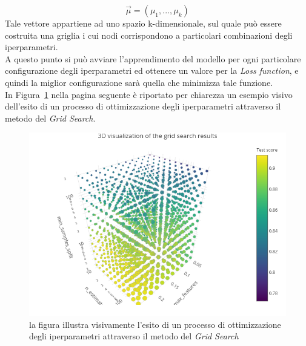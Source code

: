 \begin{equation}
\vec{\mu} = (\mu_1,...,\mu_k)
\end{equation}
Tale vettore appartiene ad uno spazio k-dimensionale, sul quale può essere costruita una griglia i cui nodi corrispondono a particolari combinazioni degli iperparametri. \\
A questo punto si può avviare l'apprendimento del modello per ogni particolare configurazione degli iperparametri ed ottenere un valore per la \textit{Loss function}, e quindi la miglior configurazione sarà quella che minimizza tale funzione. \\
In Figura~\ref{fig:Grid Search} nella pagina seguente è riportato per chiarezza un esempio visivo dell'esito di un processo di ottimizzazione degli iperparametri attraverso il metodo del \textit{Grid Search}.

\begin{figure}[h!]
	\includegraphics[width=\linewidth]{figs/Grid_immagine.png}
	\caption{la figura illustra visivamente l'esito di un processo di ottimizzazione degli iperparametri attraverso il metodo del \textit{Grid Search} \cite{knuthwebsite}}
	\label{fig:Grid Search}
\end{figure}
\newpage 

